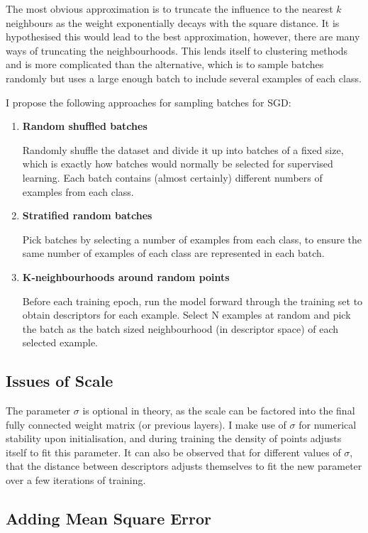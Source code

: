 The most obvious approximation is to truncate the influence to the nearest $ k $ neighbours as the weight exponentially decays with the square distance. It is hypothesised this would lead to the best approximation, however, there are many ways of truncating the neighbourhoods. This lends itself to clustering methods and is more complicated than the alternative, which is to sample batches randomly but uses a large enough batch to include several examples of each class.

I propose the following approaches for sampling batches for \gls{SGD}:

\begin{enumerate}
\item {\bf Random shuffled batches} \par
 Randomly shuffle the dataset and divide it up into batches of a fixed size, which is exactly how batches would normally be selected for supervised learning. Each batch contains (almost certainly) different numbers of examples from each class.
 \item {\bf Stratified random batches}  \par
 Pick batches by selecting a number of examples from each class, to ensure the same number of examples of each class are represented in each batch.   
 \item {\bf K-neighbourhoods around random points}  \par
 Before each training epoch, run the model forward through the training set to obtain descriptors for each example. Select N examples at random and pick the batch as the batch sized neighbourhood (in descriptor space) of each selected example.
\end {enumerate}


\subsection {Issues of Scale}

The parameter $ \sigma $ is optional in theory, as the scale can be factored into the final fully connected weight matrix (or previous layers).  I make use of $ \sigma $ for numerical stability upon initialisation, and during training the density of points adjusts itself to fit this parameter. It can also be observed that for different values of $ \sigma $, that the distance between descriptors adjusts themselves to fit the new parameter over a few iterations of training.


\subsection {Adding Mean Square Error}

